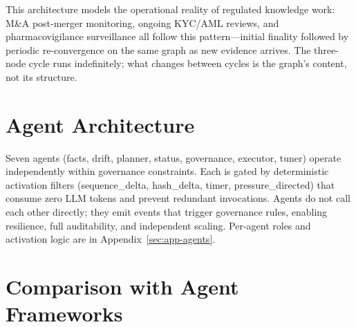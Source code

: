\documentclass[11pt]{article}
\begin{document}
This architecture models the operational reality of regulated knowledge work: M\&A post-merger monitoring, ongoing KYC/AML reviews, and pharmacovigilance surveillance all follow this pattern---initial finality followed by periodic re-convergence on the same graph as new evidence arrives. The three-node cycle runs indefinitely; what changes between cycles is the graph's content, not its structure.

\section{Agent Architecture}

Seven agents (facts, drift, planner, status, governance, executor, tuner) operate independently within governance constraints. Each is gated by deterministic activation filters (sequence\_delta, hash\_delta, timer, pressure\_directed) that consume zero LLM tokens and prevent redundant invocations. Agents do not call each other directly; they emit events that trigger governance rules, enabling resilience, full auditability, and independent scaling. Per-agent roles and activation logic are in Appendix~\ref{sec:app-agents}.

\section{Comparison with Agent Frameworks}
\end{document}
